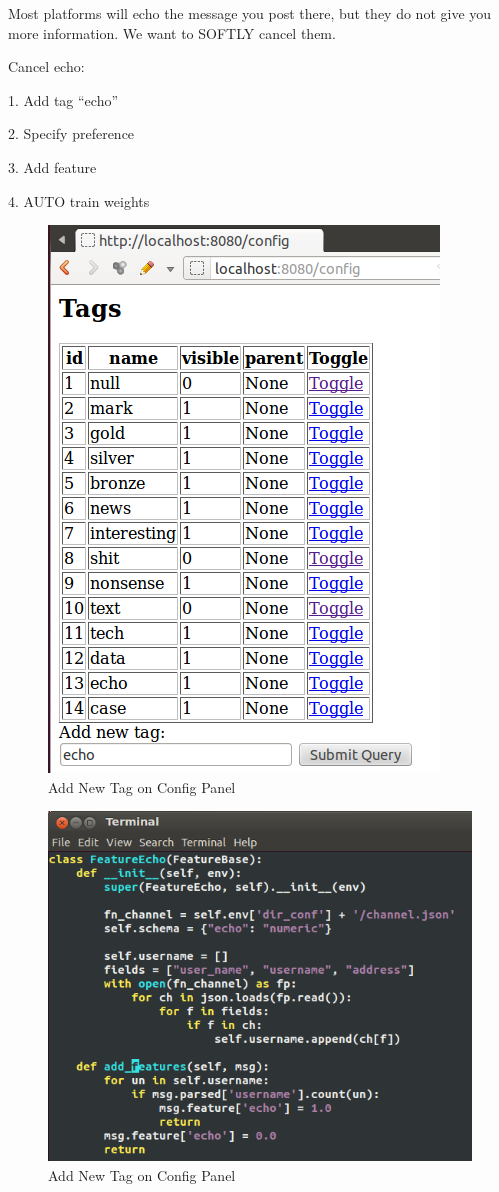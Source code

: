 \documentclass{sig-alternate}
\begin{document}
Most platforms will echo the
message you post there, but they
do not give you more information.
We want to SOFTLY cancel them.

Cancel echo:

1. Add tag ``echo''

2. Specify preference

3. Add feature

4. AUTO train weights

\begin{figure}[h!]
	\centering
	\includegraphics[width=0.7\linewidth]{../pic/echo_add_tag.png}
	\caption{Add New Tag on Config Panel}
\end{figure}

\begin{figure}[h!]
	\centering
	\includegraphics[width=0.7\linewidth]{../pic/echo_feature.png}
	\caption{Add New Tag on Config Panel}
\end{figure}
\end{document}
